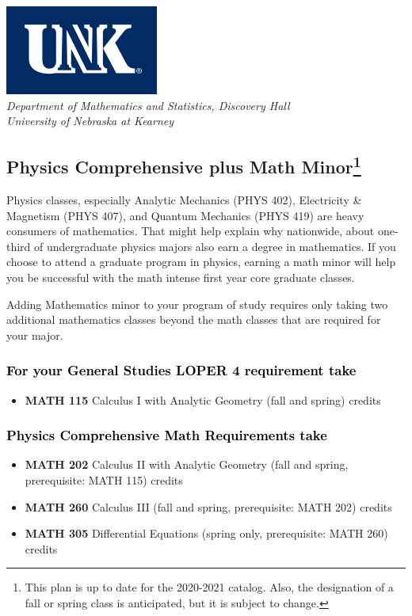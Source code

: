 \documentclass[10pt]{article}
\newcommand{\calcone}{\textbf{MATH 115} Calculus I with Analytic Geometry (fall and spring) \dotfill 5 credits}
\newcommand{\calctwo}{\textbf{MATH 202} Calculus II with Analytic Geometry (fall and spring, prerequisite: MATH 115) \dotfill 5 credits }
\newcommand{\calcthree}{\textbf{MATH 260} Calculus III  (fall and spring, prerequisite: MATH 202) \dotfill 5 credits}
\newcommand{\diffeq}{\textbf{MATH 305}	Differential Equations (spring only, prerequisite: MATH 260) \dotfill 	3 credits}
\begin{document}
\newpage


\begin{flushleft}
\includegraphics[scale=0.25]{unk-logo}\\
 \emph{\textcolor{unkblue}{Department of Mathematics and Statistics, Discovery Hall}} \\
  \emph{\textcolor{unkblue}{University of Nebraska at Kearney}}
\end{flushleft}

\subsection*{\textbf{\textcolor{unkblue}{Physics Comprehensive plus Math Minor\footnote[1]{This plan is up to date for the 2020-2021 catalog. Also, the designation of a fall or spring class is anticipated, but it is subject to change.
}}}}

\noindent Physics classes, especially  Analytic Mechanics (PHYS 402),
Electricity \& Magnetism (PHYS 407), and Quantum Mechanics (PHYS 419)
are heavy consumers of mathematics. That might help explain why nationwide, about one-third of undergraduate physics majors also earn a degree in mathematics. If you choose to attend a graduate program in physics, earning a math minor will help you be successful with the math intense first year core graduate classes.

 Adding Mathematics minor to your program of study requires only taking two additional mathematics classes beyond the math classes that are required for your major.


\subsubsection*{\textcolor{black}{For your General Studies LOPER 4 requirement take}}
\begin{itemize}
\item \calcone
\end{itemize}


\subsubsection*{\textcolor{black}{Physics Comprehensive Math Requirements take}}
\begin{itemize}
 \item \calctwo
 \item \calcthree
 \item \diffeq
\end{itemize}
\end{document}
